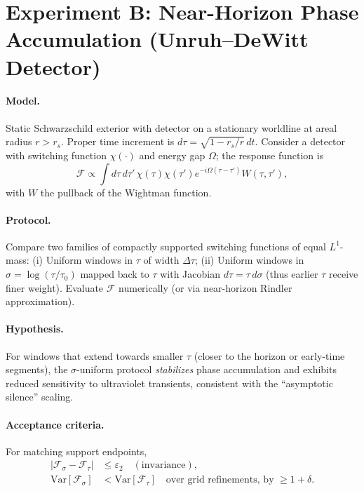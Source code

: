 \documentclass[11pt]{article}
\begin{document}
\section{Experiment B: Near-Horizon Phase Accumulation (Unruh--DeWitt Detector)}
\paragraph{Model.}
Static Schwarzschild exterior with detector on a stationary worldline at areal radius $r>r_s$.
Proper time increment is $d\tau = \sqrt{1-r_s/r}\, dt$.
Consider a detector with switching function $\chi(\cdot)$ and energy gap $\Omega$; the response function is
\begin{equation}
 \mathcal{F} \propto \int d\tau\, d\tau'\, \chi(\tau)\chi(\tau') e^{-i\Omega(\tau-\tau')} W(\tau,\tau'),
\end{equation}
with $W$ the pullback of the Wightman function.

\paragraph{Protocol.}
Compare two families of compactly supported switching functions of equal $L^1$-mass:
(i) Uniform windows in $\tau$ of width $\Delta\tau$;
(ii) Uniform windows in $\sigma=\log(\tau/\tau_0)$ mapped back to $\tau$ with Jacobian $d\tau=\tau\,d\sigma$ (thus earlier $\tau$ receive finer weight).
Evaluate $\mathcal{F}$ numerically (or via near-horizon Rindler approximation).

\paragraph{Hypothesis.}
For windows that extend towards smaller $\tau$ (closer to the horizon or early-time segments), the $\sigma$-uniform protocol \emph{stabilizes} phase accumulation and exhibits reduced sensitivity to ultraviolet transients, consistent with the ``asymptotic silence'' scaling.

\paragraph{Acceptance criteria.}
For matching support endpoints,
\begin{align}
 |\mathcal{F}_\sigma - \mathcal{F}_\tau| &\le \varepsilon_2 \quad (\text{invariance}),\\
 \mathrm{Var}[\mathcal{F}_\sigma] &< \mathrm{Var}[\mathcal{F}_\tau] \quad \text{over grid refinements, by }\ge 1+\delta.
\end{align}
\end{document}
